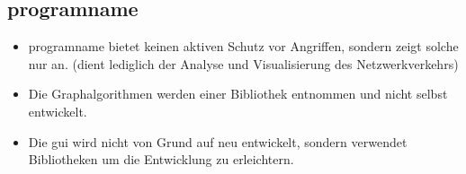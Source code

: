 \subsection{\gls{programname}}
\begin{itemize}

\item \gls{programname} bietet keinen aktiven Schutz vor Angriffen, sondern zeigt solche nur an. (dient lediglich der Analyse und Visualisierung des Netzwerkverkehrs)

\item Die Graphalgorithmen  werden einer Bibliothek entnommen und nicht selbst entwickelt.

\item Die \gls{gui} wird nicht von Grund auf neu entwickelt, sondern verwendet Bibliotheken um die Entwicklung zu erleichtern.

\end{itemize}
